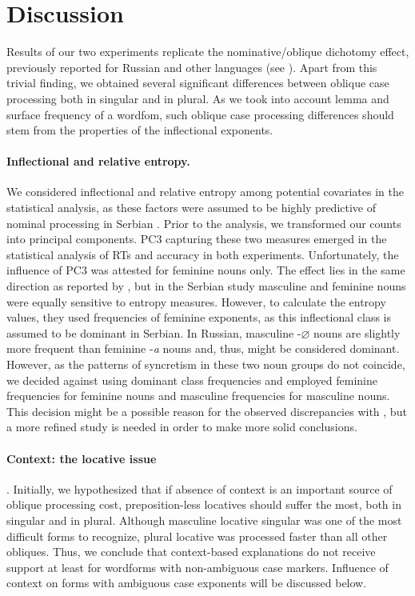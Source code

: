 \documentclass[output=paper, modfonts,newtxmath,hidelinks]{langscibook}
\begin{document}
\section{Discussion}
Results of our two experiments replicate the nominative\slash oblique dichotomy effect, previously reported for Russian and other languages (see ). Apart from this trivial finding, we obtained several significant differences between oblique case processing both in singular and in plural. As we took into account lemma and surface frequency of a wordfom, such oblique case processing differences should stem from the properties of the inflectional exponents.\\

\paragraph*{Inflectional and relative entropy.} We considered inflectional and relative entropy among potential covariates in the statistical analysis, as these factors were assumed to be highly predictive of nominal processing in Serbian \citep{milin2009simultaneous}. Prior to the analysis, we transformed our counts into principal components. PC3 capturing these two measures emerged in the statistical analysis of RTs and accuracy in both experiments. Unfortunately, the influence of PC3 was attested for feminine nouns only. The effect lies in the same direction as reported by \citet*{milin2009simultaneous}, but in the Serbian study masculine and feminine nouns were equally sensitive to entropy measures. However, to calculate the entropy values, they used frequencies of feminine exponents, as this inflectional class is assumed to be dominant in Serbian. In Russian, masculine -$\varnothing$ nouns are slightly more frequent than feminine -\textit{a} nouns \citep{samojlova2014frequencies} and, thus, might be considered dominant. However, as the patterns of syncretism in these two noun groups do not coincide, we decided against using dominant class frequencies and employed feminine frequencies for feminine nouns and masculine frequencies for masculine nouns. This decision might be a possible reason for the observed discrepancies with \citet{milin2009simultaneous}, but a more refined study is needed in order to make more solid conclusions.\\

\paragraph*{Context: the locative issue}. Initially, we hypothesized that if absence of context is an important source of oblique processing cost, preposition-less locatives should suffer the most, both in singular and in plural. Although masculine locative singular was one of the most difficult forms to recognize, plural locative was processed faster than all other obliques. Thus, we conclude that context-based explanations do not receive support at least for wordforms with non-ambiguous case markers. Influence of context on forms with ambiguous case exponents will be discussed below.\\
\end{document}
